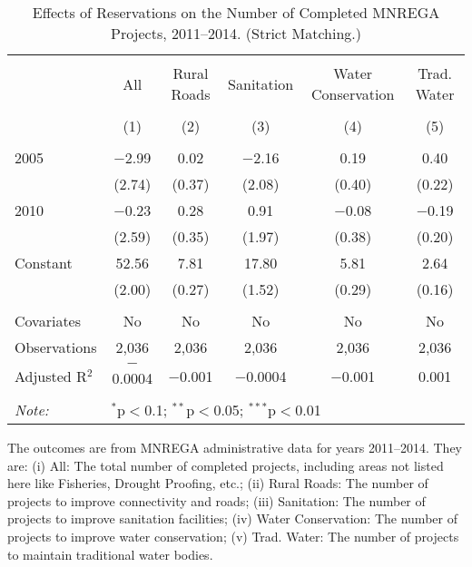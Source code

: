 \begin{table}[!htbp]
\centering
\begin{threeparttable}

  \caption{Effects of Reservations on the Number of Completed MNREGA Projects, 2011--2014. (Strict Matching.)} 
  \label{main_mnrega_strict} 
\scriptsize 
\begin{tabular}{@{\extracolsep{0pt}}lccccc} 
\\[-1.8ex]\hline 
\hline \\[-1.8ex] 
 & All & Rural Roads & Sanitation & Water Conservation & Trad. Water \\ 
\\[-1.8ex] & (1) & (2) & (3) & (4) & (5)\\ 
\hline \\[-1.8ex] 
 2005 & $-$2.99 & 0.02 & $-$2.16 & 0.19 & 0.40 \\ 
  & (2.74) & (0.37) & (2.08) & (0.40) & (0.22) \\ 
  2010 & $-$0.23 & 0.28 & 0.91 & $-$0.08 & $-$0.19 \\ 
  & (2.59) & (0.35) & (1.97) & (0.38) & (0.20) \\ 
  Constant & 52.56 & 7.81 & 17.80 & 5.81 & 2.64 \\ 
  & (2.00) & (0.27) & (1.52) & (0.29) & (0.16) \\ 
 \hline \\[-1.8ex] 
Covariates & No & No & No & No & No \\ 
Observations & 2,036 & 2,036 & 2,036 & 2,036 & 2,036 \\ 
Adjusted R$^{2}$ & $-$0.0004 & $-$0.001 & $-$0.0004 & $-$0.001 & 0.001 \\ 
\hline 
\hline \\[-1.8ex] 
\textit{Note:}  & \multicolumn{5}{l}{$^{*}$p$<$0.1; $^{**}$p$<$0.05; $^{***}$p$<$0.01} \\ 
\end{tabular} 
\begin{tablenotes}[flushleft]
\scriptsize
\item The outcomes are from MNREGA administrative data for years 2011--2014. They are: 
(i) All: The total number of completed projects, including areas not listed here like Fisheries, Drought Proofing, etc.;
(ii) Rural Roads: The number of projects to improve connectivity and roads;
(iii) Sanitation: The number of projects to improve sanitation facilities;
(iv) Water Conservation: The number of projects to improve water conservation;
(v) Trad. Water: The number of projects to maintain traditional water bodies.
\end{tablenotes}
\end{threeparttable}
\end{table}
